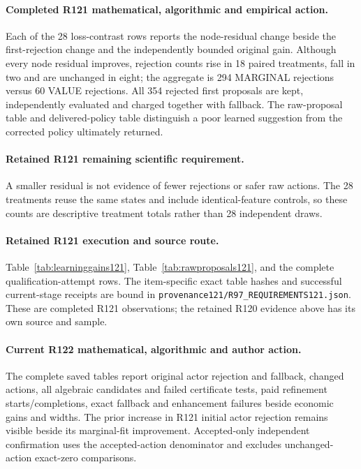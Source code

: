 \paragraph{Completed R121 mathematical, algorithmic and empirical action.}
Each of the 28 loss-contrast rows reports the node-residual change beside the first-rejection change and the independently bounded original gain. Although every node residual improves, rejection counts rise in 18 paired treatments, fall in two and are unchanged in eight; the aggregate is 294 MARGINAL rejections versus 60 VALUE rejections. All 354 rejected first proposals are kept, independently evaluated and charged together with fallback. The raw-proposal table and delivered-policy table distinguish a poor learned suggestion from the corrected policy ultimately returned.

\paragraph{Retained R121 remaining scientific requirement.}
A smaller residual is not evidence of fewer rejections or safer raw actions. The 28 treatments reuse the same states and include identical-feature controls, so these counts are descriptive treatment totals rather than 28 independent draws.

\paragraph{Retained R121 execution and source route.}
Table~\ref{tab:learninggains121}, Table~\ref{tab:rawproposals121}, and the complete qualification-attempt rows.
The item-specific exact table hashes and successful current-stage receipts are bound in \nolinkurl{provenance121/R97_REQUIREMENTS121.json}. These are completed R121 observations; the retained R120 evidence above has its own source and sample.
\paragraph{Current R122 mathematical, algorithmic and author action.}
The complete saved tables report original actor rejection and fallback, changed actions, all algebraic candidates and failed certificate tests, paid refinement starts/completions, exact fallback and enhancement failures beside economic gains and widths. The prior increase in R121 initial actor rejection remains visible beside its marginal-fit improvement. Accepted-only independent confirmation uses the accepted-action denominator and excludes unchanged-action exact-zero comparisons.
